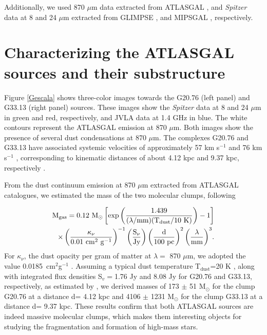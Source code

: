 \documentclass[baaa]{baaa}
\begin{document}
Additionally, we used 870 $\mu$m data extracted from ATLASGAL \citep{Schuller2010}, and \textit{Spitzer} data at 8 and 24 $\mu$m extracted from GLIMPSE \citep{benjamin2003}, and MIPSGAL \citep[]{carey2009}, respectively.



\section{Characterizing the ATLASGAL sources and their substructure}


Figure \ref{Gescala} shows three-color images towards the G20.76 (left panel) and G33.13 (right panel) sources. These images show the \textit{Spitzer} data at 8 and 24 $\mu$m in green and red, respectively, and JVLA data at 1.4 GHz in blue. The white contours represent the ATLASGAL emission at 870 $\mu$m. Both images show the presence of several dust condensations at 870 $\mu$m. The complexes G20.76 and G33.13 have associated systemic velocities of approximately 57 km s$^{-1}$ and 76 km s$^{-1}$ \citep{Wienen2012}, corresponding to kinematic distances of about 4.12 kpc and 9.37 kpc, respectively \citep{Wienen2015}.


From the dust continuum emission at 870 $\mu$m extracted from ATLASGAL catalogues, we estimated the mass of the two molecular clumps, following \cite{Kauffmann2008}

\begin{align*}
\label{mass-1}
{\rm M_{gas}=0.12~M_\odot \left[\rm exp\left(\frac{1.439} {(\lambda/mm)(T_{dust}/10~K)}\right)-1\right]} \\ \nonumber {\rm \times\left(\frac{\kappa_{\nu}}{0.01~cm^2~g^{-1}}\right)^{-1}\left(\frac{S_{\nu}}{Jy}\right)\left(\frac{d}{100~pc}\right)^2\left(\frac{\lambda}{mm}\right)^3}.
\end{align*}
For $\kappa_{\nu}$, the dust opacity per gram of matter at $\lambda=$ 870 $\mu$m, we adopted the value 0.0185~cm$^2$g$^{-1}$ \citep{Csengeri2017}. Assuming a typical dust temperature T$_{\mathrm{dust}}$=20 K \citep{Wienen2012}, along with integrated flux densities S$_{v}=$1.76 Jy and 8.08 Jy for G20.76 and G33.13, respectively, as estimated by \citet{Csengeri14}, we derived masses of 173 $\pm$ 51 M$_\odot$ for the clump G20.76 at a distance d= 4.12 kpc and 4106 $\pm$ 1231 M$_\odot$ for the clump G33.13 at a distance d= 9.37 kpc. These results confirm that both ATLASGAL sources are indeed massive molecular clumps, which makes them interesting objects for studying the fragmentation and formation of high-mass stars. 
\end{document}
